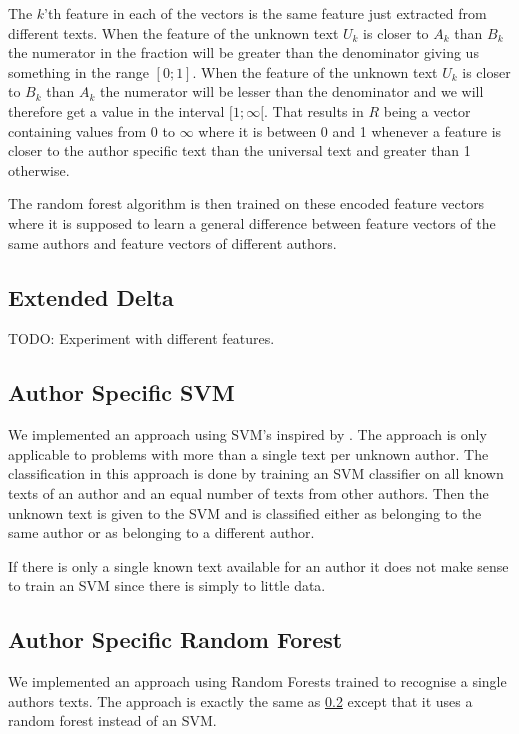 The $k$'th feature in each of the vectors is the same feature just extracted
from different texts. When the feature of the unknown text $U_k$ is closer to
$A_k$ than $B_k$ the numerator in the fraction will be greater than the
denominator giving us something in the range $[0; 1]$. When the feature of the
unknown text $U_k$ is closer to $B_k$ than $A_k$ the numerator will be lesser
than the denominator and we will therefore get a value in the interval
$[1; \infty[$. That results in $R$ being a vector containing values from 0 to
$\infty$ where it is between 0 and 1 whenever a feature is closer to the author
specific text than the universal text and greater than 1 otherwise.

The random forest algorithm is then trained on these encoded feature vectors
where it is supposed to learn a general difference between feature vectors of
the same authors and feature vectors of different authors.

\subsection{Extended Delta}
TODO: Experiment with different features.

\subsection{Author Specific SVM} \label{subsec:author_specific_svm}
We implemented an approach using \gls{SVM}'s inspired by \cite{hansen2014}. The
approach is only applicable to problems with more than a single text per
unknown author. The classification in this approach is done by training an \gls{SVM}
classifier on all known texts of an author and an equal number of texts from
other authors. Then the unknown text is given to the \gls{SVM} and is classified
either as belonging to the same author or as belonging to a different author.

If there is only a single known text available for an author it does not make
sense to train an \gls{SVM} since there is simply to little data.

\subsection{Author Specific Random Forest}
We implemented an approach using Random Forests trained to recognise a single
authors texts. The approach is exactly the same as
\ref{subsec:author_specific_svm} except that it uses a random forest instead of
an \gls{SVM}.

